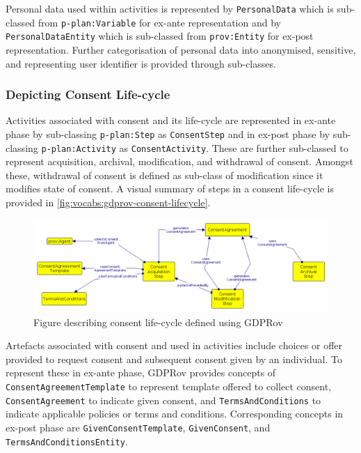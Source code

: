 Personal data used within activities is represented by \texttt{PersonalData} which is sub-classed from \texttt{p-plan:Variable} for ex-ante representation and by \texttt{PersonalDataEntity} which is sub-classed from \texttt{prov:Entity} for ex-post representation.
Further categorisation of personal data into anonymised, sensitive, and representing user identifier is provided through sub-classes.

\subsubsection{Depicting Consent Life-cycle}
Activities associated with consent and its life-cycle are represented in ex-ante phase by sub-classing \texttt{p-plan:Step} as \texttt{ConsentStep} and in ex-post phase by sub-classing \texttt{p-plan:Activity} as \texttt{ConsentActivity}.
These are further sub-classed to represent acquisition, archival, modification, and withdrawal of consent.
Amongst these, withdrawal of consent is defined as sub-class of modification since it modifies state of consent.
A visual summary of steps in a consent life-cycle is provided in \autoref{fig:vocabs:gdprov-consent-lifecycle}.
\begin{figure}[htbp]
    \centering
    \includegraphics[width=\linewidth]{img/GDPRov_consent_lifecycle.png}
    \caption{Figure describing consent life-cycle defined using GDPRov}
    \label{fig:vocabs:gdprov-consent-lifecycle}
\end{figure}

Artefacts associated with consent and used in activities include choices or offer provided to request consent and subsequent consent given by an individual.
To represent these in ex-ante phase, GDPRov provides concepts of \texttt{ConsentAgreementTemplate} to represent template offered to collect consent, \texttt{ConsentAgreement} to indicate given consent, and \texttt{TermsAndConditions} to indicate applicable policies or terms and conditions.
Corresponding concepts in ex-post phase are \texttt{GivenConsentTemplate}, \texttt{GivenConsent}, and \texttt{TermsAndConditionsEntity}.

